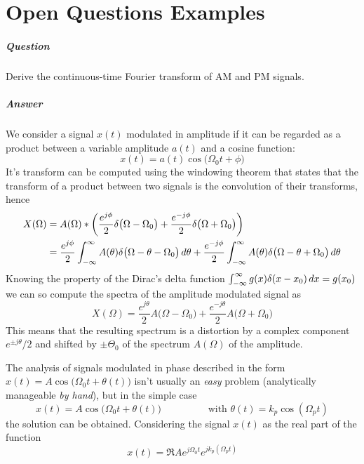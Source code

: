 \chapter{Open Questions Examples}

\newquestion
	\paragraph{Question} Derive the continuous-time Fourier transform of AM and PM signals.
	
	\paragraph{Answer} We consider a signal $x(t)$ modulated in amplitude if it can be regarded as a product between a variable amplitude $a(t)$ and a cosine function:
	\[ x(t) = a(t) \cos\big(\Omega_0 t + \phi\big) \]
	It's transform can be computed using the windowing theorem that states that the transform of a product between two signals is the convolution of their transforms, hence 
	\begin{align*}
		X(\Omega) & = A(\Omega) * \left( \frac {e^{j\phi}} 2 \delta\big(\Omega-\Omega_0\big) + \frac {e^{-j\phi}} 2 \delta\big(\Omega+\Omega_0\big) \right) \\
		& = \frac{e^{j\phi}}{2} \int_{-\infty}^\infty A(\theta) \delta\big(\Omega-\theta-\Omega_0\big)\, d\theta + \frac{e^{-j\phi}}{2} \int_{-\infty}^\infty A(\theta) \delta\big(\Omega-\theta+\Omega_0\big)\, d\theta
	\end{align*}
	Knowing the property of the Dirac's delta function $\int_{-\infty}^\infty g(x) \delta(x-x_0) \, dx = g(x_0)$ we can so compute the spectra of the amplitude modulated signal as
	\[ X(\Omega) = \frac{e^{j\theta}}{2} A\big(\Omega-\Omega_0\big) + \frac{e^{-j\theta}}{2} A\big(\Omega+\Omega_0\big)  \]
	This means that the resulting spectrum is a distortion by a complex component $e^{\pm j \theta} / 2$ and shifted by $\pm\Theta_0$ of the spectrum $A(\Omega)$ of the amplitude.
	
	The analysis of signals modulated in phase described in the form $x(t) = A \cos\big(\Omega_0t + \theta(t) \big)$ isn't usually an \textit{easy} problem (analytically manageable \textit{by hand}), but in the simple case
	\[ x(t) = A \cos\big(\Omega_0t + \theta(t)\big) \hspace{2cm} \textrm{with } \theta(t) = k_p \cos(\Omega_pt) \]
	the solution can be obtained. Considering the signal $x(t)$ as the real part of the function
	\[ x(t) = \Re{ A e^{j\Omega_0t} e^{jk_p(\Omega_pt)} } \]	
	
